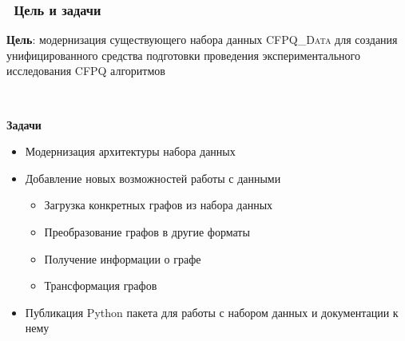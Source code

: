 \begin{frame}
	\transwipe[direction=90]
	\frametitle{\faThumbTack\ Цель и задачи}
	\textbf{Цель}: модернизация существующего набора данных \textsc{CFPQ\_Data} для создания унифицированного средства подготовки проведения экспериментального исследования CFPQ алгоритмов
	  
	~\
	  
	\textbf{Задачи}
	
	\newline
	
	\begin{itemize}
		\item[\bullet] Модернизация архитектуры набора данных
		\item[\bullet] Добавление новых возможностей работы с данными
		      \begin{itemize}
		      	\item[\bullet] Загрузка конкретных графов из набора данных
		      	\item[\bullet] Преобразование графов в другие форматы
		      	\item[\bullet] Получение информации о графе
		      	\item[\bullet] Трансформация графов
		      \end{itemize}
		\item[\bullet] Публикация Python пакета для работы с набором данных и документации к нему
	\end{itemize}
	
\end{frame}

